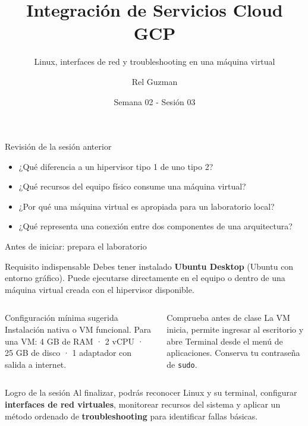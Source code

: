\documentclass[aspectratio=169,10pt,c]{beamer}
\title{Integración de Servicios Cloud GCP}
\subtitle{Linux, interfaces de red y troubleshooting en una máquina virtual}
\date{Semana 02 - Sesión 03}
\author{Rel Guzman}
\begin{document}
{\maketitle}

\begin{frame}{Revisión de la sesión anterior}
\begin{itemize}\setlength\itemsep{9pt}
  \item ¿Qué diferencia a un hipervisor tipo 1 de uno tipo 2?
  \item ¿Qué recursos del equipo físico consume una máquina virtual?
  \item ¿Por qué una máquina virtual es apropiada para un laboratorio local?
  \item ¿Qué representa una conexión entre dos componentes de una arquitectura?
\end{itemize}
\end{frame}

\begin{frame}{Antes de iniciar: prepara el laboratorio}
\begin{alertblock}{Requisito indispensable}
Debes tener instalado \textbf{Ubuntu Desktop} (Ubuntu con entorno gráfico). Puede ejecutarse directamente en el equipo o dentro de una máquina virtual creada con el hipervisor disponible.
\end{alertblock}
\begin{columns}[T,onlytextwidth]
\begin{block}{Configuración mínima sugerida}
\small Instalación nativa o VM funcional. Para una VM: 4 GB de RAM · 2 vCPU · 25 GB de disco · 1 adaptador con salida a internet.
\end{block}
\begin{exampleblock}{Comprueba antes de clase}
\small La VM inicia, permite ingresar al escritorio y abre Terminal desde el menú de aplicaciones. Conserva tu contraseña de \texttt{sudo}.
\end{exampleblock}
\end{columns}
\end{frame}

\begin{frame}[c]
\begin{block}{Logro de la sesión}
Al finalizar, podrás reconocer Linux y su terminal, configurar \textbf{interfaces de red virtuales}, monitorear recursos del sistema y aplicar un método ordenado de \textbf{troubleshooting} para identificar fallas básicas.
\end{block}
\end{frame}
\end{document}
